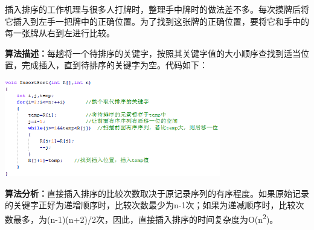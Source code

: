 {插入排序的工作机理与很多人打牌时，整理手中牌时的做法差不多。每次摸牌后将它插入到左手一把牌中的正确位置。为了找到这张牌的正确位置，要将它和手中的每一张牌从右到左进行比较。}

{\textbf{算法描述：}每趟将一个待排序的关键字，按照其关键字值的大小顺序查找到适当位置，完成插入，直到待排序的关键字为空。代码如下：}

\includegraphics[width=3.70833in,height=1.66667in]{png-jpeg-pics/C128245F708560642ED13F460DF8388E.png}{}

{\textbf{算法分析：}直接插入排序的比较次数取决于原记录序列的有序程度。如果原始记录的关键字正好为递增顺序时，比较次数最少为n-1次；如果为递减顺序时，比较次数最多，为(n-1)(n+2)/2次，因此，直接插入排序的时间复杂度为O(n}\textsuperscript{2}{)。}

